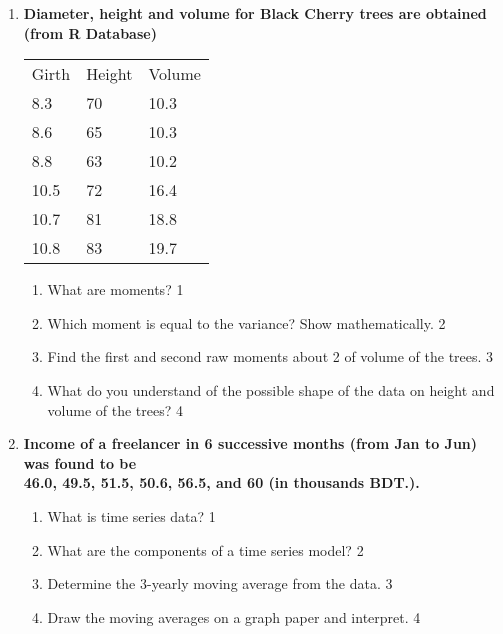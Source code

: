 \documentclass{article}
\begin{document}
\begin{enumerate}
 \item
	  \textbf{Diameter, height and volume for Black Cherry trees are obtained (from R Database)}
	
\begin{table}[h]
 \begin{center}
\begin{tabular}{l|l|l}
\hline
Girth & Height & Volume \\
8.3   & 70     & 10.3   \\ 
8.6   & 65     & 10.3   \\ 
8.8   & 63     & 10.2   \\ 
10.5  & 72     & 16.4   \\ 
10.7  & 81     & 18.8   \\ 
10.8  & 83     & 19.7   \\  \hline
\end{tabular}
\end{center}
\end{table}
  
  \begin{enumerate}
    \item
	What are moments? \hfill 1
    \item
	Which moment is equal to the variance? Show mathematically. \hfill 2
    \item  
	Find the first and second raw moments about 2 of volume of the trees. \hfill 3
    \item
	What do you understand of the possible shape of the data on height and volume of the trees? \hfill 4
\end{enumerate}

 \item
	  \textbf{Income of a freelancer in 6 successive months (from Jan to Jun) was found to be \\ 46.0, 49.5, 51.5, 50.6, 56.5, and 60 (in thousands BDT.).}
  \begin{enumerate}
    \item
	What is time series data? \hfill 1
    \item
	What are the components of a time series model? \hfill 2
    \item  
	Determine the 3-yearly moving average from the data. \hfill 3
    \item
	Draw the moving averages on a graph paper and interpret. \hfill 4
\end{enumerate}


\end{enumerate}
\end{document}
